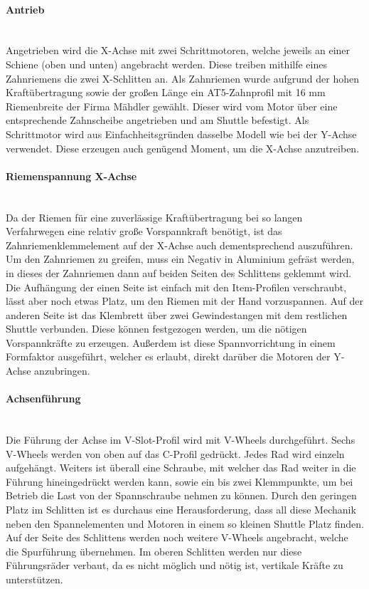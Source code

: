 \paragraph{Antrieb}\mbox{}\\
Angetrieben wird die X-Achse mit zwei Schrittmotoren, welche jeweils an einer Schiene (oben und unten) angebracht werden. Diese treiben mithilfe eines Zahnriemens die zwei X-Schlitten an. Als Zahnriemen wurde aufgrund der hohen Kraftübertragung sowie der großen Länge ein AT5-Zahnprofil mit 16 mm Riemenbreite der Firma Mähdler gewählt. Dieser wird vom Motor über eine entsprechende Zahnscheibe angetrieben und am Shuttle befestigt. Als Schrittmotor wird aus Einfachheitsgründen dasselbe Modell wie bei der Y-Achse verwendet. Diese erzeugen auch genügend Moment, um die X-Achse anzutreiben.

\paragraph{Riemenspannung X-Achse} \mbox{}\\
Da der Riemen für eine zuverlässige Kraftübertragung bei so langen Verfahrwegen eine relativ große Vorspannkraft benötigt, ist das Zahnriemenklemmelement auf der X-Achse auch dementsprechend auszuführen. Um den Zahnriemen zu greifen, muss ein Negativ in Aluminium gefräst werden, in dieses der Zahnriemen dann auf beiden Seiten des Schlittens geklemmt wird. Die Aufhängung der einen Seite ist einfach mit den Item-Profilen verschraubt, lässt aber noch etwas Platz, um den Riemen mit der Hand vorzuspannen. Auf der anderen Seite ist das Klembrett über zwei Gewindestangen mit dem restlichen Shuttle verbunden. Diese können festgezogen werden, um die nötigen Vorspannkräfte zu erzeugen. Außerdem ist diese Spannvorrichtung in einem Formfaktor ausgeführt, welcher es erlaubt, direkt darüber die Motoren der Y-Achse anzubringen.

\paragraph{Achsenführung} \mbox{}\\
Die Führung der Achse im V-Slot-Profil wird mit V-Wheels durchgeführt. Sechs V-Wheels werden von oben auf das C-Profil gedrückt. Jedes Rad wird einzeln aufgehängt. Weiters ist überall eine Schraube, mit welcher das Rad weiter in die Führung hineingedrückt werden kann, sowie ein bis zwei Klemmpunkte, um bei Betrieb die Last von der Spannschraube nehmen zu können. Durch den geringen Platz im Schlitten ist es durchaus eine Herausforderung, dass all diese Mechanik neben den Spannelementen und Motoren in einem so kleinen Shuttle Platz finden. Auf der Seite des Schlittens werden noch weitere V-Wheels angebracht, welche die Spurführung übernehmen.
Im oberen Schlitten werden nur diese Führungsräder verbaut, da es nicht möglich und nötig ist, vertikale Kräfte zu unterstützen.

